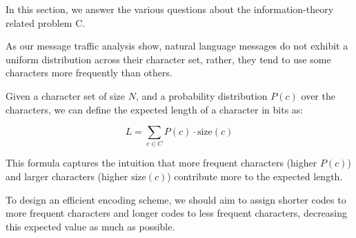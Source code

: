 \documentclass{solutionclass} %
\begin{document}
    In this section, we answer the various questions about the information-theory related problem C.

    \begin{solution}[Question 1]
        As our message traffic analysis show, natural language messages do not exhibit a uniform distribution across their character set, rather, they tend to use some characters more frequently than others.

        Given a character set of size $N$, and a probability distribution $P(c)$ over the characters, we can define the expected length of a character in bits as:

        \begin{equation}\label{eq:exp_length}
            L = \sum_{c \in C} P(c) \cdot \text{size}(c)
        \end{equation}

        This formula captures the intuition that more frequent characters (higher $P(c)$) and larger characters (higher $\text{size}(c)$) contribute more to the expected length.

        To design an efficient encoding scheme, we should aim to assign shorter codes to more frequent characters and longer codes to less frequent characters, decreasing this expected value as much as possible.
    \end{solution}
\end{document}
